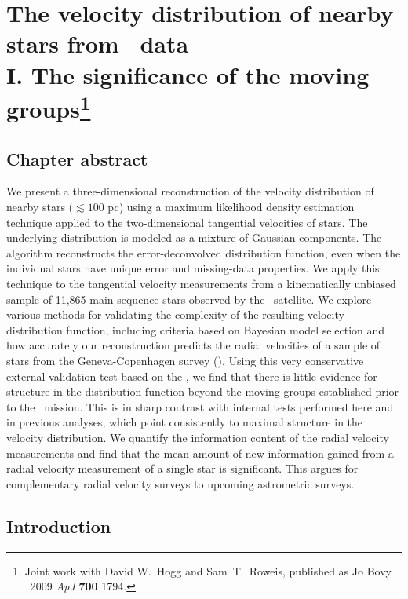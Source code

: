 
\chapter[The velocity distribution of nearby stars from \Hipparcos\ data I. The significance of the moving groups]{The velocity distribution of nearby stars from \Hipparcos\ data\\
I. The significance of the moving groups\protect\footnote{Joint work
with David W.~Hogg and Sam~T.~Roweis, published as Jo Bovy \etal\
2009 \emph{ApJ} {\bf 700} 1794.}}\label{chap:veldist}

\section{Chapter abstract}
We present a three-dimensional reconstruction of the velocity
distribution of nearby stars ($\lesssim 100$ pc) using a maximum
likelihood density estimation technique applied to the two-dimensional
tangential velocities of stars. The underlying distribution is modeled
as a mixture of Gaussian components. The algorithm reconstructs the
error-deconvolved distribution function, even when the individual
stars have unique error and missing-data properties. We apply this
technique to the tangential velocity measurements from a kinematically
unbiased sample of 11,865 main sequence stars observed by the
\Hipparcos\ satellite.  We explore various methods for validating the
complexity of the resulting velocity distribution function, including
criteria based on Bayesian model selection and how accurately our
reconstruction predicts the radial velocities of a sample of stars
from the Geneva-Copenhagen survey (\gcsabb). Using this very
conservative external validation test based on the \gcsabb, we find
that there is little evidence for structure in the distribution
function beyond the moving groups established prior to the \Hipparcos\
mission. This is in sharp contrast with internal tests performed here
and in previous analyses, which point consistently to maximal
structure in the velocity distribution. We quantify the information
content of the radial velocity measurements and find that the mean
amount of new information gained from a radial velocity measurement of
a single star is significant. This argues for complementary radial
velocity surveys to upcoming astrometric surveys.


\section{Introduction}

